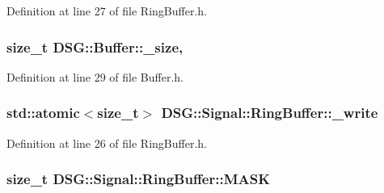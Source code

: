 Definition at line 27 of file Ring\+Buffer.\+h.

\hypertarget{classDSG_1_1Buffer_a4e2fef9ed617af2554b25c999def8f71}{
\subsubsection[{\+\_\+size}]{\setlength{\rightskip}{0pt plus 5cm}size\+\_\+t D\+S\+G\+::\+Buffer\+::\+\_\+size\hspace{0.3cm}{\ttfamily [protected]}, {\ttfamily [inherited]}}}\label{classDSG_1_1Buffer_a4e2fef9ed617af2554b25c999def8f71}


Definition at line 29 of file Buffer.\+h.

\hypertarget{classDSG_1_1Signal_1_1RingBuffer_aa470f52f306c4a5027f4aaeb5cf3110a}{
\subsubsection[{\+\_\+write}]{\setlength{\rightskip}{0pt plus 5cm}std\+::atomic$<$size\+\_\+t$>$ D\+S\+G\+::\+Signal\+::\+Ring\+Buffer\+::\+\_\+write\hspace{0.3cm}{\ttfamily [protected]}}}\label{classDSG_1_1Signal_1_1RingBuffer_aa470f52f306c4a5027f4aaeb5cf3110a}


Definition at line 26 of file Ring\+Buffer.\+h.

\hypertarget{classDSG_1_1Signal_1_1RingBuffer_adfa7cc981cbd2693cac87cbef96cf186}{
\subsubsection[{M\+A\+S\+K}]{\setlength{\rightskip}{0pt plus 5cm}size\+\_\+t D\+S\+G\+::\+Signal\+::\+Ring\+Buffer\+::\+M\+A\+S\+K\hspace{0.3cm}{\ttfamily [protected]}}}\label{classDSG_1_1Signal_1_1RingBuffer_adfa7cc981cbd2693cac87cbef96cf186}


